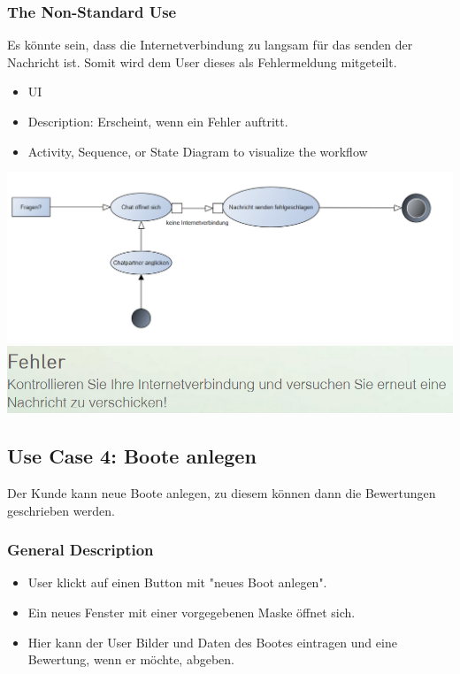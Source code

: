 \documentclass[12pt]{article}
\theoremstyle{definition}
\begin{document}
\subsubsection{The Non-Standard Use}
Es könnte sein, dass die Internetverbindung zu langsam für das senden der Nachricht ist. Somit wird dem User dieses als Fehlermeldung mitgeteilt.
\begin{itemize}
	\item UI
	\item Description: Erscheint, wenn ein Fehler auftritt.
	\item Activity, Sequence, or State Diagram to visualize the workflow
\end{itemize}
\includegraphics[height=0.40\textwidth]{Chatten_Fehler.PNG}
\includegraphics[height=0.40\textwidth]{Fehler2.PNG}
\pagebreak


\subsection{Use Case 4: Boote anlegen}
Der Kunde kann neue Boote anlegen, zu diesem können dann die Bewertungen geschrieben werden.
\subsubsection{General Description}
	\begin{itemize}
		\item User klickt auf einen Button mit "neues Boot anlegen".
		\item Ein neues Fenster mit einer vorgegebenen Maske öffnet sich.
		\item Hier kann der User Bilder und Daten des Bootes eintragen und eine Bewertung, wenn er möchte, abgeben.
	\end{itemize}
\end{document}
